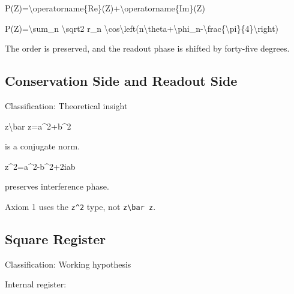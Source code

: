 \documentclass[
  a4paper,
]{article}
\newenvironment{Shaded}{}{}
\newcommand{\NormalTok}[1]{#1}
\begin{document}
\begin{Shaded}
\begin{Highlighting}[]
\NormalTok{P(Z)=\textbackslash{}operatorname\{Re\}(Z)+\textbackslash{}operatorname\{Im\}(Z)}
\end{Highlighting}
\end{Shaded}

\begin{Shaded}
\begin{Highlighting}[]
\NormalTok{P(Z)=\textbackslash{}sum\_n \textbackslash{}sqrt2 r\_n}
\NormalTok{\textbackslash{}cos\textbackslash{}left(n\textbackslash{}theta+\textbackslash{}phi\_n{-}\textbackslash{}frac\{\textbackslash{}pi\}\{4\}\textbackslash{}right)}
\end{Highlighting}
\end{Shaded}

The order is preserved, and the readout phase is shifted by forty-five
degrees.

\subsection{Conservation Side and Readout
Side}\label{conservation-side-and-readout-side}

Classification: Theoretical insight

\begin{Shaded}
\begin{Highlighting}[]
\NormalTok{z\textbackslash{}bar z=a\^{}2+b\^{}2}
\end{Highlighting}
\end{Shaded}

is a conjugate norm.

\begin{Shaded}
\begin{Highlighting}[]
\NormalTok{z\^{}2=a\^{}2{-}b\^{}2+2iab}
\end{Highlighting}
\end{Shaded}

preserves interference phase.

Axiom 1 uses the \texttt{z\^{}2} type, not
\texttt{z\textbackslash{}bar\ z}.

\subsection{Square Register}\label{square-register}

Classification: Working hypothesis

Internal register:
\end{document}

